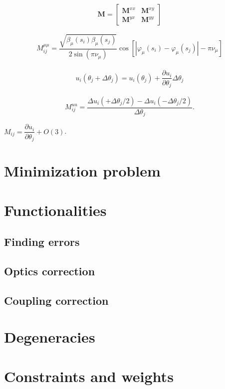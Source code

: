 \begin{equation}
    \mathbf{M} = \begin{bmatrix}
    \mathbf{M}^{xx} & \mathbf{M}^{xy} \\
    \mathbf{M}^{yx} & \mathbf{M}^{yy} 
\end{bmatrix}
\end{equation}

\begin{align}
M_{ij}^{\mu\mu} = \dfrac{\sqrt{\beta_{\mu}(s_i)\beta_{\mu}(s_j)}}{2\sin\left(\pi\nu_{\mu}\right)}\cos\left[ |\varphi_{\mu}(s_i) - \varphi_{\mu}(s_j)| - \pi\nu_{\mu} \right]
\label{matrix}
\end{align}


\begin{align}
    u_i\left({\theta_j+\Delta\theta_j}\right) = u_i\left(\theta_j\right) + \dfrac{\partial u_i}{\partial \theta_j} \Delta \theta_j
\end{align}

\begin{equation}
    M^{u u}_{ij} = \dfrac{\Delta u_i (+\Delta \theta_j/2) - \Delta u_i (-\Delta \theta_j/2)}{\Delta \theta_j}.
    \label{medida}
\end{equation}

$M_{ij} = \dfrac{\partial u_i}{\partial \theta_j} + O(3)$.





\section{Minimization problem}

\section{Functionalities}
\subsection{Finding errors}
\subsection{Optics correction}
\subsection{Coupling correction}

\section{Degeneracies}

\section{Constraints and weights}

